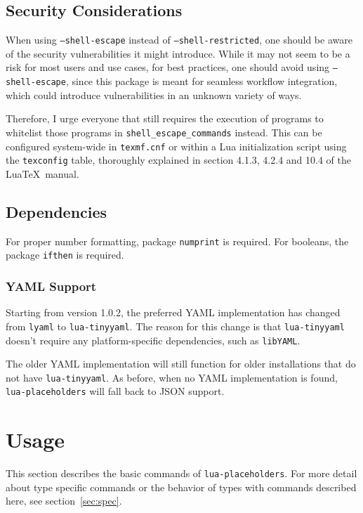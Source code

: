 \documentclass{ltxdoc}
\begin{document}
    \begin{multicols}{2}
        \subsection{Security Considerations}
        When using \texttt{--shell-escape} instead of \texttt{--shell-restricted}, one should be aware of the security vulnerabilities it might introduce.
        While it may not seem to be a risk for most users and use cases, for best practices, one should avoid using \texttt{--shell-escape}, since this package is meant for seamless workflow integration, which could introduce vulnerabilities in an unknown variety of ways.

        Therefore, I urge everyone that still requires the execution of programs to whitelist those programs in \texttt{shell\_escape\_commands} instead.
        This can be configured system-wide in \texttt{texmf.cnf} or within a Lua initialization script using the \texttt{texconfig} table, thoroughly explained in section 4.1.3, 4.2.4 and 10.4 of the Lua\TeX\ manual\cite{luatex}.

        \columnbreak

        \subsection{Dependencies}
        For proper number formatting, package \texttt{numprint}\cite{numprint} is required.
        For booleans, the package \texttt{ifthen}\cite{ifthen} is required.
        \subsubsection{YAML Support}
        Starting from version 1.0.2, the preferred YAML implementation has changed from \texttt{lyaml}\cite{lyaml} to \texttt{lua-tinyyaml}\cite{lua-tinyyaml}.
        The reason for this change is that \texttt{lua-tinyyaml} doesn't require any platform-specific dependencies, such as \texttt{libYAML}\cite{libYAML}.

        The older YAML implementation will still function for older installations that do not have \texttt{lua-tinyyaml}.
        As before, when no YAML implementation is found, \texttt{lua-placeholders} will fall back to JSON support.
    \end{multicols}


    \clearpage
    \section{Usage}
    This section describes the basic commands of \texttt{lua-placeholders}.
    For more detail about type specific commands or the behavior of types with commands described here, see section~\ref{sec:spec}.\\
\end{document}
